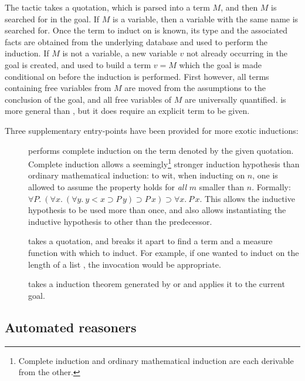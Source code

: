 The  tactic takes a quotation, which is parsed into a
term $M$, and then $M$ is searched for in the goal. If $M$ is a
variable, then a variable with the same name is searched for. Once the
term to induct on is known, its type and the associated facts are
obtained from the underlying database and used to perform the
induction.  If $M$ is not a variable, a new variable $v$ not already
occurring in the goal is created, and used to build a term $v = M$
which the goal is made conditional on before the induction is
performed. First however, all terms containing free variables from $M$
are moved from the assumptions to the conclusion of the goal, and all
free variables of $M$ are universally quantified.  is
more general than , but it does require an explicit term to
be given.

Three supplementary entry-points have been provided for more exotic
inductions:
\begin{description}
\item [] performs complete induction on the
  term denoted by the given quotation. Complete induction allows a
  seemingly\footnote{Complete induction and ordinary mathematical
    induction are each derivable from the other.} stronger induction
  hypothesis than ordinary mathematical induction: to wit, when
  inducting on $n$, one is allowed to assume the property holds for
  \emph{all} $m$ smaller than $n$. Formally: $\forall P.\ (\forall x.\
  (\forall y.\ y < x \supset P\, y) \supset P\,x) \supset \forall x.\
  P\,x$. This allows the inductive hypothesis to be used more than
  once, and also allows instantiating the inductive hypothesis to
  other than the predecessor.

\item [] takes a quotation, and breaks it
  apart to find a term and a measure function with which to induct.
  For example, if one wanted to induct on the length of a list
  \holtxt{L}, the invocation \ml{measureInduct\_on~`LENGTH L`}
  would be appropriate.

\item [] takes a induction theorem generated by
 or  and applies it to the current goal.

\end{description}


\subsection{Automated reasoners}
\label{sec:automated-reasoners}

